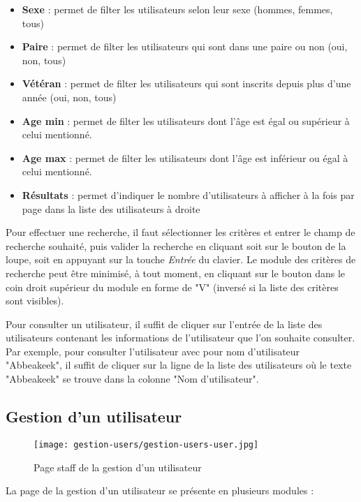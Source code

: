\begin{itemize}
\item \textbf{Sexe} : permet de filter les utilisateurs selon leur sexe (hommes, femmes, tous)
\item \textbf{Paire} : permet de filter les utilisateurs qui sont dans une paire ou non (oui, non, tous)
\item \textbf{Vétéran} : permet de filter les utilisateurs qui sont inscrits depuis plus d'une année (oui, non, tous)
\item \textbf{Age min} : permet de filter les utilisateurs dont l'âge est égal ou supérieur à celui mentionné.
\item \textbf{Age max} : permet de filter les utilisateurs dont l'âge est inférieur ou égal à celui mentionné.
\item \textbf{Résultats} : permet d'indiquer le nombre d'utilisateurs à afficher à la fois par page dans la liste des utilisateurs à droite
\end{itemize}
\bigskip

Pour effectuer une recherche, il faut sélectionner les critères et entrer le champ de recherche souhaité, puis valider la recherche en cliquant soit sur le bouton de la loupe, soit en appuyant sur la touche \textit{Entrée} du clavier. Le module des critères de recherche peut être minimisé, à tout moment, en cliquant sur le bouton dans le coin droit supérieur du module en forme de "V" (inversé si la liste des critères sont visibles).\newline

Pour consulter un utilisateur, il suffit de cliquer sur l'entrée de la liste des utilisateurs contenant les informations de l'utilisateur que l'on souhaite consulter. Par exemple, pour consulter l'utilisateur avec pour nom d'utilisateur "Abbeakeek", il suffit de cliquer sur la ligne de la liste des utilisateurs où le texte "Abbeakeek" se trouve dans la colonne "Nom d'utilisateur".

\subsection{Gestion d'un utilisateur}

\begin{figure}[H]
\centering
\texttt{[image: gestion-users/gestion-users-user.jpg]}
\caption{Page staff de la gestion d'un utilisateur}
\end{figure}

La page de la gestion d'un utilisateur se présente en plusieurs modules :

